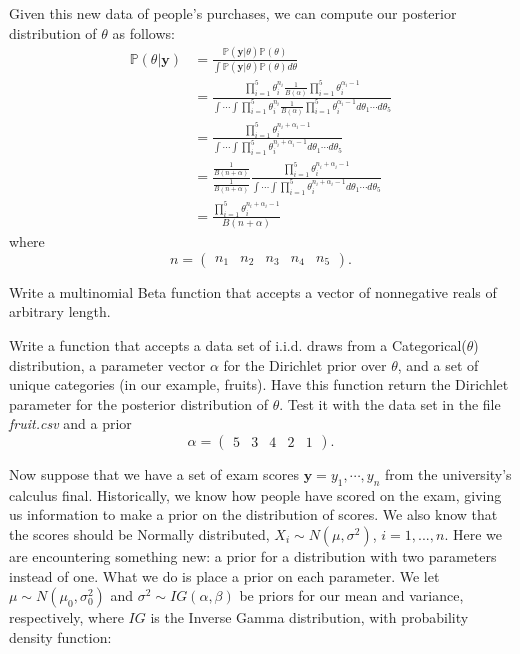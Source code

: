 Given this new data of people's purchases, we can compute our posterior distribution of $\theta$ as follows:
\begin{align*}
\mathbb{P}(\theta | \mathbf{y}) & = \frac{\mathbb{P}(\mathbf{y} | \theta) \mathbb{P}(\theta)}{\int \mathbb{P}(\mathbf{y} | \theta) \mathbb{P}(\theta) d\theta} \\
& = \frac{\prod_{i=1}^{5} \theta_{i}^{n_{i}} \frac{1}{B(\alpha)} \prod_{i=1}^{5} \theta_{i}^{\alpha_{i}-1}}{\int \cdots \int \prod_{i=1}^{5} \theta_{i}^{n_{i}} \frac{1}{B(\alpha)} \prod_{i=1}^{5} \theta_{i}^{\alpha_{i}-1} d\theta_{1}\cdots d\theta_{5}} \\
& = \frac{\prod_{i=1}^{5} \theta_{i}^{n_{i} + \alpha_{i} - 1}}{\int \cdots \int \prod_{i=1}^{5} \theta_{i}^{n_{i} + \alpha_{i} - 1} d\theta_{1} \cdots d\theta_{5}} \\
& = \frac{\frac{1}{B(n + \alpha)}}{\frac{1}{B(n+\alpha)}} \frac{\prod_{i=1}^{5} \theta_{i}^{n_{i} + \alpha_{i} - 1}}{\int \cdots \int \prod_{i=1}^{5} \theta_{i}^{n_{i} + \alpha_{i} - 1} d\theta_{1} \cdots d\theta_{5}} \\
& = \frac{\prod_{i=1}^{5} \theta_{i}^{n_{i} + \alpha_{i} - 1}}{B(n + \alpha)}
\end{align*}
where $$n = \left( \begin{array}{ccccc} n_{1} & n_{2} & n_{3} & n_{4} & n_{5} \end{array} \right).$$

\begin{problem}
Write a multinomial Beta function that accepts a vector of nonnegative reals of arbitrary length.
\end{problem}

\begin{problem}
Write a function that accepts a data set of i.i.d. draws from a Categorical($\theta$) distribution, a parameter vector $\alpha$ for the Dirichlet prior over $\theta$, and a set of unique categories (in our example, fruits). Have this function return the Dirichlet parameter for the posterior distribution of $\theta$. Test it with the data set in the file \emph{fruit.csv} and a prior $$\alpha = \left( \begin{array}{ccccc} 5 & 3 & 4 & 2 & 1 \end{array} \right).$$
\end{problem}

Now suppose that we have a set of exam scores $\mathbf{y} = y_{1}, \cdots, y_{n}$ from the university's calculus final. Historically, we know how people have scored on the exam, giving us information to make a prior on the distribution of scores. We also know that the scores should be Normally distributed, $X_i \sim N(\mu,\sigma^2)$, $i=1,...,n$. Here we are encountering something new: a prior for a distribution with two parameters instead of one. What we do is place a prior on each parameter. We let $\mu \sim N(\mu_{0}, \sigma_{0}^{2})$ and $\sigma^{2} \sim IG(\alpha, \beta)$ be priors for our mean and variance, respectively, where $IG$ is the Inverse Gamma distribution, with probability density function:

